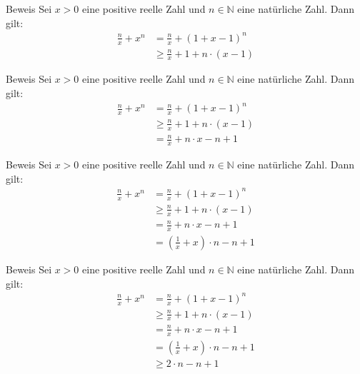 \documentclass[10pt]{beamer}
\def\bN{\mathbb{N}}
\begin{document}
\begin{frame}{Beweis}
    Sei \( x > 0 \) eine positive reelle Zahl und \( n \in \bN \) eine natürliche Zahl. Dann gilt:
    \begin{align*}
        \frac{n}{x} + x^{n}
        & = \frac{n}{x} + \left(1 + x - 1 \right)^{n} \\
        & \geq \frac{n}{x} + 1 + n \cdot \left(x - 1 \right)
    \end{align*}
\end{frame}



\begin{frame}{Beweis}
    Sei \( x > 0 \) eine positive reelle Zahl und \( n \in \bN \) eine natürliche Zahl. Dann gilt:
    \begin{align*}
        \frac{n}{x} + x^{n}
        & = \frac{n}{x} + \left(1 + x - 1 \right)^{n} \\
        & \geq \frac{n}{x} + 1 + n \cdot \left(x - 1 \right) \\
        & = \frac{n}{x} + n \cdot x - n + 1
    \end{align*}
\end{frame}



\begin{frame}{Beweis}
    Sei \( x > 0 \) eine positive reelle Zahl und \( n \in \bN \) eine natürliche Zahl. Dann gilt:
    \begin{align*}
        \frac{n}{x} + x^{n}
        & = \frac{n}{x} + \left(1 + x - 1 \right)^{n} \\
        & \geq \frac{n}{x} + 1 + n \cdot \left(x - 1 \right) \\
        & = \frac{n}{x} + n \cdot x - n + 1 \\
        & = \left( \frac{1}{x} + x \right) \cdot n - n + 1
    \end{align*}
\end{frame}



\begin{frame}{Beweis}
    Sei \( x > 0 \) eine positive reelle Zahl und \( n \in \bN \) eine natürliche Zahl. Dann gilt:
    \begin{align*}
        \frac{n}{x} + x^{n}
        & = \frac{n}{x} + \left(1 + x - 1 \right)^{n} \\
        & \geq \frac{n}{x} + 1 + n \cdot \left(x - 1 \right) \\
        & = \frac{n}{x} + n \cdot x - n + 1 \\
        & = \left( \frac{1}{x} + x \right) \cdot n - n + 1 \\
        & \geq 2 \cdot n - n + 1
    \end{align*}
\end{frame}
\end{document}

